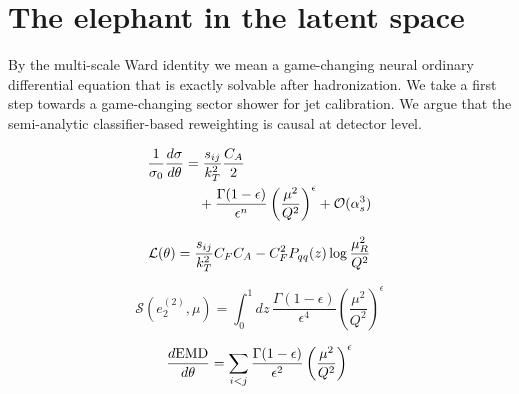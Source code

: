 \section{The elephant in the latent space}\label{sec:elephant-latent-space}

By the multi-scale Ward identity we mean a game-changing neural ordinary
differential equation that is exactly solvable after hadronization. We
take a first step towards a game-changing sector shower for jet
calibration. We argue that the semi-analytic classifier-based
reweighting is causal at detector level.

\begin{align}
  \frac{1}{\sigma_0} \frac{d\sigma}{d\theta} &= \frac{s_{ij}}{k_T^2} \frac{C_A}{2} \nonumber \\
  &\quad + \frac{\Gamma(1-\epsilon)}{\epsilon^{n}} \left(\frac{\mu^2}{Q^2}\right)^{\epsilon} + \mathcal{O}(\alpha_s^3) \label{eq:1}
\end{align}

\begin{equation}
  \mathcal{L}(\theta) = \frac{s_{ij}}{k_T^2} C_F C_A - C_F^2 P_{qq}(z) \log\frac{\mu_R^2}{Q^2}
  \label{eq:3}
\end{equation}

\begin{equation}
  \mathcal{S}(e_2^{(2)}, \mu) = \int_0^1 dz \, \frac{\Gamma(1-\epsilon)}{\epsilon^{4}} \left(\frac{\mu^2}{Q^2}\right)^{\epsilon}
  \label{eq:5}
\end{equation}

\begin{equation}
  \frac{d \mathrm{EMD}}{d \theta} = \sum_{i<j} \frac{\Gamma(1-\epsilon)}{\epsilon^{2}} \left(\frac{\mu^2}{Q^2}\right)^{\epsilon}
  \label{eq:7}
\end{equation}

